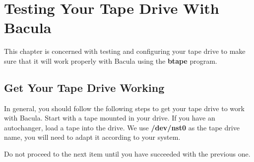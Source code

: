 
\chapter{Testing Your Tape Drive With Bacula}
\label{TapeTestingChapter}

This chapter is concerned with testing and configuring your tape drive to make
sure that it will work properly with Bacula using the {\bf btape} program. 
\label{summary}

\section{Get Your Tape Drive Working}

In general, you should follow the following steps to get your tape drive to
work with Bacula. Start with a tape mounted in your drive. If you have an
autochanger, load a tape into the drive. We use {\bf /dev/nst0} as the tape
drive name, you will need to adapt it according to your system. 

Do not proceed to the next item until you have succeeded with the previous
one. 

